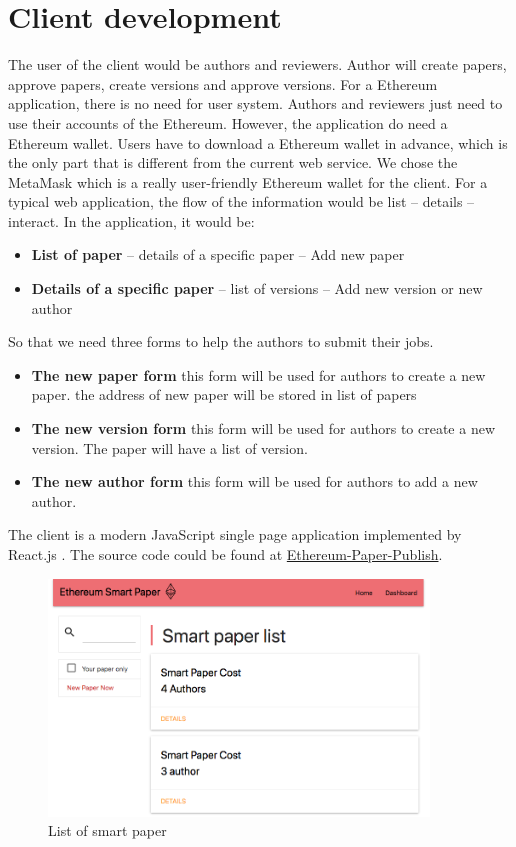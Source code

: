 \documentclass[openany,12pt]{ecsthesis}      %
\begin{document}
\section{Client development}
The user of the client would be authors and reviewers. 
Author will create papers, approve papers, create versions and approve versions. 
For a Ethereum application, there is no need for user system. 
Authors and reviewers just need to use their accounts of the Ethereum. 
However, the application do need a Ethereum wallet. Users have to download a Ethereum wallet in advance,
which is the only part that is different from the current web service.
We chose the MetaMask which is a really user-friendly Ethereum wallet for the client.
For a typical web application, the flow of the information would be list -- details -- interact. 
In the application, it would be:
\begin{itemize}
  \item \textbf{List of paper} -- details of a specific paper -- Add new paper
  \item \textbf{Details of a specific paper} -- list of versions -- Add new version or new author
\end{itemize}
So that we need three forms to help the authors to submit their jobs.
\begin{itemize}
  \item \textbf{The new paper form} this form will be used for authors to create a new paper. the address of new paper will be stored in list of papers
  \item \textbf{The new version form} this form will be used for authors to create a new version. The paper will have a list of version.
  \item \textbf{The new author form} this form will be used for authors to add a new author.
\end{itemize}
The client is a modern JavaScript single page application implemented by React.js \cite{react}.
The source code could be found at \href{https://gitlab.com/yixuanxu94/Ethereum-Paper-Publish}{Ethereum-Paper-Publish}.
\begin{figure}[H]
  \centering
  \includegraphics[width=0.9\textwidth]{app1.png}
  \caption{List of smart paper}
  \label{list} 
\end{figure}
\end{document}
